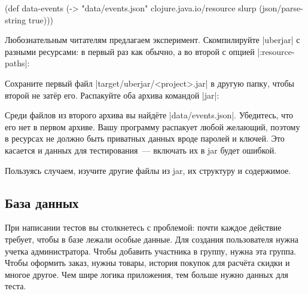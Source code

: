 \begin{english}
  \begin{clojure}
(def data-events
  (-> "data/events.json"
      clojure.java.io/resource
      slurp
      (json/parse-string true)))
  \end{clojure}
\end{english}


Любознательным читателям предлагаем эксперимент. Скомпилируйте \spverb|uberjar|
с разными ресурсами: в первый раз как обычно, а во второй с опцией
\spverb|:resource-paths|:

\begin{english}
  \begin{clojure}
:profiles {:uberjar {:resource-paths ["env/test/resources"]}
  \end{clojure}
\end{english}


Сохраните первый файл \spverb|target/uberjar/<project>.jar| в другую папку,
чтобы второй не затёр его. Распакуйте оба архива командой \spverb|jar|:

\begin{english}
\end{english}

Среди файлов из второго архива вы найдёте \spverb|data/events.json|. Убедитесь,
что его нет в первом архиве. Вашу программу распакует любой желающий, поэтому в
ресурсах не должно быть приватных данных вроде паролей и ключей. Это касается и
данных для тестирования~--- включать их в jar будет ошибкой.

Пользуясь случаем, изучите другие файлы из jar, их структуру и содержимое.

\subsection{База данных}


При написании тестов вы столкнетесь с проблемой: почти каждое действие требует,
чтобы в базе лежали особые данные. Для создания пользователя нужна учетка
администратора. Чтобы добавить участника в группу, нужна эта группа. Чтобы
оформить заказ, нужны товары, история покупок для расчёта скидки и многое
другое. Чем шире логика приложения, тем больше нужно данных для теста.

